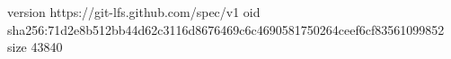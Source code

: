 version https://git-lfs.github.com/spec/v1
oid sha256:71d2e8b512bb44d62c3116d8676469c6c4690581750264ceef6cf83561099852
size 43840
